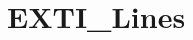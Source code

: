 \hypertarget{group___e_x_t_i___lines}{\section{E\-X\-T\-I\-\_\-\-Lines}
\label{group___e_x_t_i___lines}
}
